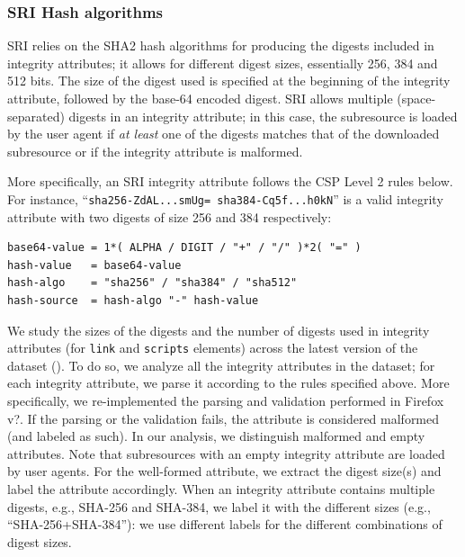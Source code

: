 \documentclass[sigconf,table]{acmart}
\begin{document}
\subsubsection{SRI Hash algorithms}
SRI relies on the SHA2 hash algorithms for producing the digests included in integrity attributes; it allows for different digest sizes, essentially 256, 384 and 512 bits.
The size of the digest used is specified at the beginning of the integrity attribute, followed by the base-64 encoded digest.
SRI allows multiple (space-separated) digests in an integrity attribute; in this case, the subresource is loaded by the user agent if \emph{at least} one of the digests matches that of the downloaded subresource or if the integrity attribute is malformed.

More specifically, an SRI integrity attribute follows the CSP Level 2 rules below. For instance, ``\texttt{sha256-ZdAL...smUg= sha384-Cq5f...h0kN}'' is a valid integrity attribute with two digests of size 256 and 384 respectively:
\begin{lstlisting}[basicstyle=\footnotesize]
base64-value = 1*( ALPHA / DIGIT / "+" / "/" )*2( "=" )
hash-value   = base64-value
hash-algo    = "sha256" / "sha384" / "sha512"
hash-source  = hash-algo "-" hash-value 
\end{lstlisting}

We study the sizes of the digests and the number of digests used in integrity attributes (for \texttt{link} and \texttt{scripts} elements) across the latest version of the \CCSRI dataset (\CCSnapshotLatest). To do so, we analyze all the integrity attributes in the dataset; for each integrity attribute, we parse it according to the rules specified above. More specifically, we re-implemented the parsing and validation performed in Firefox v?. If the parsing or the validation fails, the attribute is considered malformed (and labeled as such). In our analysis, we distinguish malformed and empty attributes. Note that subresources with an empty integrity attribute are loaded by user agents. For the well-formed attribute, we extract the digest size(s) and label the attribute accordingly. When an integrity attribute contains multiple digests, e.g., SHA-256 and SHA-384, we label it with the different sizes (e.g., ``SHA-256+SHA-384''): we use different labels for the different combinations of digest sizes. 
\end{document}
